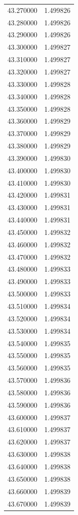 \begin{tabular}{rr}
43.270000 & 1.499826 \\
43.280000 & 1.499826 \\
43.290000 & 1.499826 \\
43.300000 & 1.499827 \\
43.310000 & 1.499827 \\
43.320000 & 1.499827 \\
43.330000 & 1.499828 \\
43.340000 & 1.499828 \\
43.350000 & 1.499828 \\
43.360000 & 1.499829 \\
43.370000 & 1.499829 \\
43.380000 & 1.499829 \\
43.390000 & 1.499830 \\
43.400000 & 1.499830 \\
43.410000 & 1.499830 \\
43.420000 & 1.499831 \\
43.430000 & 1.499831 \\
43.440000 & 1.499831 \\
43.450000 & 1.499832 \\
43.460000 & 1.499832 \\
43.470000 & 1.499832 \\
43.480000 & 1.499833 \\
43.490000 & 1.499833 \\
43.500000 & 1.499833 \\
43.510000 & 1.499834 \\
43.520000 & 1.499834 \\
43.530000 & 1.499834 \\
43.540000 & 1.499835 \\
43.550000 & 1.499835 \\
43.560000 & 1.499835 \\
43.570000 & 1.499836 \\
43.580000 & 1.499836 \\
43.590000 & 1.499836 \\
43.600000 & 1.499837 \\
43.610000 & 1.499837 \\
43.620000 & 1.499837 \\
43.630000 & 1.499838 \\
43.640000 & 1.499838 \\
43.650000 & 1.499838 \\
43.660000 & 1.499839 \\
43.670000 & 1.499839 \\

\end{tabular}
